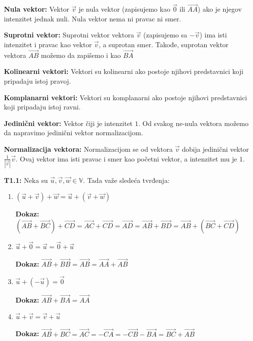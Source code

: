 \documentclass[12pt]{article}
\newcommand{\vek}[1]{\overrightarrow{#1}}
\begin{document}
\textbf{Nula vektor:} Vektor $\vek{v}$ je nula vektor (zapisujemo kao $\vek{0}$
ili $\vek{AA}$) ako je njegov intenzitet jednak nuli. Nula vektor nema ni
pravac ni smer.
\par

\textbf{Suprotni vektor:} Suprotni vektor vektora $\vek{v}$ (zapisujemo sa
$-\vek{v}$) ima isti intenzitet i pravac kao vektor $\vek{v}$, a suprotan smer.
Takođe, suprotan vektor vektora $\vek{AB}$ možemo da zapišemo i kao $\vek{BA}$
\par

\textbf{Kolinearni vektori:} Vektori su kolinearni ako postoje njihovi predstavnici
koji pripadaju istoj pravoj.
\par

\textbf{Komplanarni vektori:} Vektori su komplanarni ako postoje njihovi predstavnici
koji pripadaju istoj ravni.
\par

\textbf{Jedinični vektor:} Vektor čiji je intenzitet $1$. Od svakog ne-nula
vektora možemo da napravimo jedinični vektor normalizacijom.
\par

\textbf{Normalizacija vektora:} Normalizacijom se od vektora $\vek{v}$ dobija
jedinični vektor $\frac{1}{|\vek{v}|}\vek{v}$. Ovaj vektor ima isti pravac
i smer kao početni vektor, a intenzitet mu je $1$.
\par

\textbf{T1.1:} Neka su $\vek{u}, \vek{v}, \vek{w}\in\mathbb{V}$. Tada važe
sledeća tvrđenja:
\begin{enumerate}[label=\textbf{(S\arabic*)}]
    \item $(\vek{u}+\vek{v})+\vek{w}=\vek{u}+(\vek{v}+\vek{w})$\par
          \textbf{Dokaz:}
          $(\vek{AB}+\vek{BC})+\vek{CD}=\vek{AC}+\vek{CD}=\vek{AD}
              =\vek{AB}+\vek{BD}=\vek{AB}+(\vek{BC}+\vek{CD})$
    \item
          $\vek{u}+\vek{0}=\vek{u}=\vek{0}+\vek{u}$\par
          \textbf{Dokaz:}
          $\vek{AB}+\vek{BB}=\vek{AB}=\vek{AA}+\vek{AB}$
    \item $\vek{u}+(-\vek{u})=\vek{0}$\par
          \textbf{Dokaz:}
          $\vek{AB}+\vek{BA}=\vek{AA}$
    \item $\vek{u}+\vek{v}=\vek{v}+\vek{u}$\par
          \textbf{Dokaz:}
          $\vek{AB}+\vek{BC}=\vek{AC}=-\vek{CA}=-\vek{CB}-\vek{BA}
              =\vek{BC}+\vek{AB}$
\end{enumerate}
\end{document}
